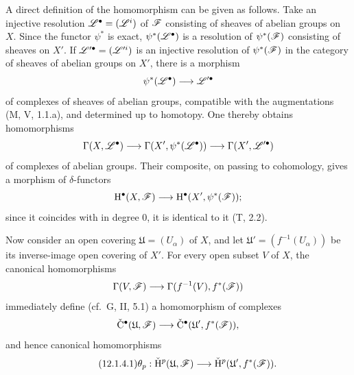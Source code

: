 \begin{env}[12.1.4]
\label{0.12.1.4}
A direct definition of the homomorphism  can be
given as follows.
Take an injective resolution
$\mathscr{L}^\bullet=(\mathscr{L}^i)$ of $\mathscr{F}$ consisting of sheaves of
abelian groups on $X$.
Since the functor $\psi^*$ is exact,
$\psi^*(\mathscr{L}^\bullet)$ is a resolution of $\psi^*(\mathscr{F})$
consisting of sheaves on $X'$.
If $\mathscr{L}'^\bullet=(\mathscr{L}'^i)$ is an injective resolution of
$\psi^*(\mathscr{F})$ in the category of sheaves of abelian groups on
$X'$, there is a morphism
\[
  \psi^*(\mathscr{L}^\bullet)\longrightarrow\mathscr{L}'^\bullet
\]
of complexes of sheaves of abelian groups, compatible with the
augmentations (M, V, 1.1.a), and determined up to homotopy.
One thereby obtains homomorphisms
\[
  \Gamma(X,\mathscr{L}^\bullet)
  \longrightarrow
  \Gamma(X',\psi^*(\mathscr{L}^\bullet))
  \longrightarrow
  \Gamma(X',\mathscr{L}'^\bullet)
\]
of complexes of abelian groups.
Their composite, on passing to cohomology, gives a morphism of
$\delta$-functors
\[
  \mathrm{H}^\bullet(X,\mathscr{F})
  \longrightarrow
  \mathrm{H}^\bullet(X',\psi^*(\mathscr{F}));
\]
since it coincides with  in degree $0$, it is
identical to it (T, 2.2).

Now consider an open covering
$\mathfrak{U}=(U_\alpha)$ of $X$, and let
$\mathfrak{U}'=(f^{-1}(U_\alpha))$ be its inverse-image open covering
of $X'$.
For every open subset $V$ of $X$, the canonical homomorphisms
\[
  \Gamma(V,\mathscr{F})
  \longrightarrow
  \Gamma(f^{-1}(V),f^*(\mathscr{F}))
\]
immediately define (cf.\ G, II, 5.1) a homomorphism of complexes
\[
  \check{\mathrm{C}}^\bullet(\mathfrak{U},\mathscr{F})
  \longrightarrow
  \check{\mathrm{C}}^\bullet(\mathfrak{U}',f^*(\mathscr{F})),
\]
and hence canonical homomorphisms
\[
\label{0.12.1.4.1}
\tag{12.1.4.1}
  \theta_p:
  \check{\mathrm{H}}^p(\mathfrak{U},\mathscr{F})
  \longrightarrow
  \check{\mathrm{H}}^p(\mathfrak{U}',f^*(\mathscr{F})).
\]


\end{env}
